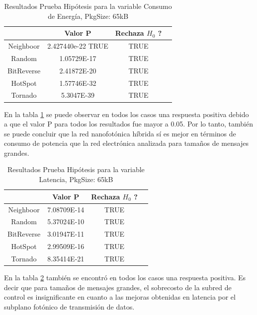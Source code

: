 \begin{table}[H]
\centering
\begin{tabular}{|c|c|c|c|}
\hline
&Valor P&Rechaza $H_0$ ?\\
\hline
Neighboor&2.427440e-22 TRUE&TRUE\\
Random&1.05729E-17&TRUE\\
BitReverse&2.41872E-20&TRUE\\
HotSpot&1.57746E-32&TRUE\\
Tornado&5.3047E-39&TRUE\\
\hline
\end{tabular}
\caption{Resultados Prueba Hipótesis para la variable Consumo de Energía, PkgSize: 65kB}
\label{tb:ettest65k}
\end{table}

En la tabla \ref{tb:ettest65k} se puede observar en todos los casos una
respuesta positiva debido a que el valor P para
todos los resultados fue mayor a 0.05. Por lo tanto, también se puede concluir que 
la red nanofotónica híbrida sí es mejor en términos de consumo de potencia
que la red electrónica analizada para tamaños de mensajes grandes.

\begin{table}[H]
\centering
\begin{tabular}{|c|c|c|c|}
\hline
&Valor P&Rechaza $H_0$ ?\\
\hline
Neighboor&7.08709E-14&TRUE\\
Random&5.37024E-10&TRUE\\
BitReverse&3.01947E-11&TRUE\\
HotSpot&2.99509E-16&TRUE\\
Tornado&8.35414E-21&TRUE\\
\hline
\end{tabular}
\caption{Resultados Prueba Hipótesis para la variable Latencia, PkgSize: 65kB}
\label{tb:lttest65k}
\end{table}

En la tabla \ref{tb:lttest65k} también se encontró en todos los casos una
respuesta positiva. Es decir que para tamaños de mensajes grandes, el sobrecosto
de la subred de control es insignificante en cuanto a las mejoras obtenidas
en latencia por el subplano fotónico de transmisión de datos.

